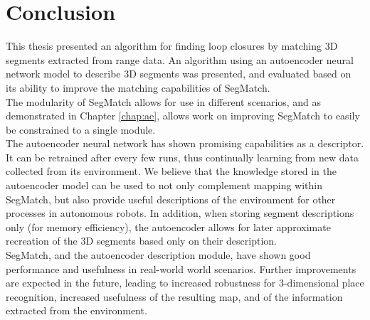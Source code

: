 \chapter{Conclusion}
\label{chap:conclusion}

This thesis presented an algorithm for finding loop closures by matching 3D segments extracted from range data. An algorithm using an autoencoder neural network model to describe 3D segments was presented, and evaluated based on its ability to improve the matching capabilities of SegMatch.\\

The modularity of SegMatch allows for use in different scenarios, and as demonstrated in Chapter \ref{chap:ae}, allows work on improving SegMatch to easily be constrained to a single module.\\

The autoencoder neural network has shown promising capabilities as a descriptor. It can be retrained after every few runs, thus continually learning from new data collected from its environment. We believe that the knowledge stored in the autoencoder model can be used to not only complement mapping within SegMatch, but also provide useful descriptions of the environment for other processes in autonomous robots. In addition, when storing segment descriptions only (for memory efficiency), the autoencoder allows for later approximate recreation of the 3D segments based only on their description.\\

SegMatch, and the autoencoder description module, have shown good performance and usefulness in real-world world scenarios. Further improvements are expected in the future, leading to increased robustness for 3-dimensional place recognition, increased usefulness of the resulting map, and of the information extracted from the environment.


